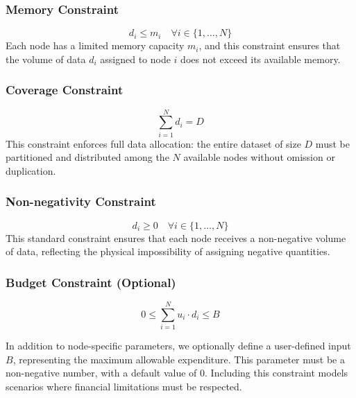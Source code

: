 \documentclass[]{interact}
\theoremstyle{plain}
\theoremstyle{definition}
\theoremstyle{remark}
\begin{document}
\subsubsection{Memory Constraint}
\begin{equation}
    d_i \leq m_i \quad \forall i \in \{1, \ldots, N\}
\end{equation}
Each node has a limited memory capacity $m_i$, and this constraint ensures that the volume of data $d_i$ assigned to node $i$ does not exceed its available memory.

\subsubsection{Coverage Constraint}
\begin{equation}
    \sum_{i=1}^{N} d_i = D
\end{equation}
This constraint enforces full data allocation: the entire dataset of size $D$ must be partitioned and distributed among the $N$ available nodes without omission or duplication.

\subsubsection{Non-negativity Constraint}
\begin{equation}
    d_i \geq 0 \quad \forall i \in \{1, \ldots, N\}
\end{equation}
This standard constraint ensures that each node receives a non-negative volume of data, reflecting the physical impossibility of assigning negative quantities.


\subsubsection{Budget Constraint (Optional)}
\begin{equation}
    0 \leq \sum_{i=1}^{N} u_i \cdot d_i \leq B
\end{equation}

In addition to node-specific parameters, we optionally define a user-defined input $B$, representing the maximum allowable expenditure. This parameter must be a non-negative number, with a default value of $0$. Including this constraint models scenarios where financial limitations must be respected.
\end{document}
